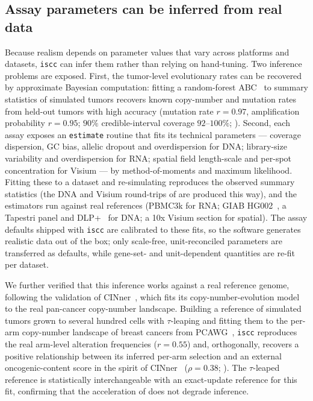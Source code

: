 \documentclass{article}
\begin{document}
\subsection{Assay parameters can be inferred from real data}
\label{sec:inference}
Because realism depends on parameter values that vary across platforms and datasets,
\texttt{iscc} can infer them rather than relying on hand-tuning. Two inference problems are
exposed. First, the tumor-level evolutionary rates can be recovered by approximate Bayesian
computation: fitting a random-forest ABC~\cite{raynal_abc_2019} to summary statistics of
simulated tumors recovers known copy-number and mutation rates from held-out tumors with high
accuracy (mutation rate $r=0.97$, amplification probability $r=0.95$; $90\%$ credible-interval
coverage $92$--$100\%$; ). Second, each assay exposes an
\texttt{estimate} routine that fits its technical parameters --- coverage dispersion, GC bias,
allelic dropout and overdispersion for DNA; library-size variability and overdispersion for
RNA; spatial field length-scale and per-spot concentration for Visium --- by method-of-moments
and maximum likelihood. Fitting these to a dataset and re-simulating reproduces the observed
summary statistics (the DNA and Visium round-trips of 
are produced this way), and the estimators run against real references (PBMC3k for RNA; GIAB
HG002~\cite{zook_giab_2019}, a Tapestri panel and DLP+~\cite{laks_dlp_2019} for DNA; a 10x
Visium section for spatial). The assay defaults
shipped with \texttt{iscc} are calibrated to these fits, so the software generates realistic data
out of the box; only scale-free, unit-reconciled parameters are transferred as defaults, while
gene-set- and unit-dependent quantities are re-fit per dataset.

We further verified that this inference works against a real reference genome, following the
validation of CINner~\cite{dinh_cinner_2025}, which fits its copy-number-evolution model to the
real pan-cancer copy-number landscape. Building a reference of simulated tumors grown to several
hundred cells with $\tau$-leaping and fitting them to the per-arm copy-number landscape of breast
cancers from PCAWG~\cite{pcawg_2020}, \texttt{iscc} reproduces the real arm-level alteration frequencies
($r=0.55$) and, orthogonally, recovers a positive relationship between its inferred per-arm
selection and an external oncogenic-content score in the spirit of CINner~\cite{dinh_cinner_2025}
($\rho=0.38$; ). The $\tau$-leaped reference is statistically
interchangeable with an exact-update reference for this fit, confirming that the acceleration of
 does not degrade inference.
\end{document}
